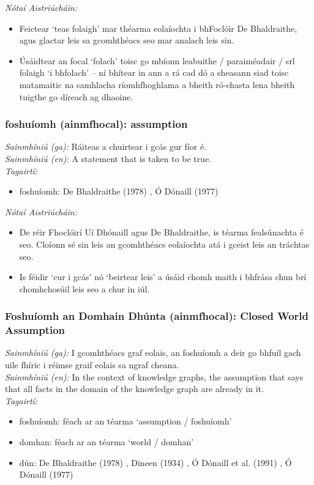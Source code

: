 \documentclass{article}
\begin{document}
 \noindent \textit{Nótaí Aistriúcháin:}
\begin{itemize}
	\item Feictear `teas folaigh' mar théarma eolaíochta i bhFoclóir De Bhaldraithe, agus glactar leis sa gcomhthéacs seo mar analach leis sin.
	\item Úsáidtear an focal `folach' toisc go mbíonn leabuithe / paraiméadair / srl folaigh `i bhfolach' -- ní bhítear in ann a rá cad dó a sheasann siad toisc matamaitic na samhlacha ríomhfhoghlama a bheith ró-chasta lena bheith tuigthe go díreach ag dhaoine.
\end{itemize}


\subsubsection*{foshuíomh (ainmfhocal): assumption}
 \noindent \textit{Sainmhíniú (ga):} Ráiteas a chuirtear i gcás gur fíor é.
\\
 \noindent \textit{Sainmhíniú (en):} A statement that is taken to be true.
\\
 \noindent \textit{Tagairtí:}
\begin{itemize}
	\item foshuíomh: De Bhaldraithe (1978) \cite{de-bhaldraithe}, Ó Dónaill (1977) \cite{odonaill}
\end{itemize}

 \noindent \textit{Nótaí Aistriúcháin:}
\begin{itemize}
	\item De réir Fhoclóirí Uí Dhónaill agus De Bhaldraithe, is téarma fealsúnachta é seo. Cloíonn sé sin leis an gcomhthéacs eolaíochta atá i gceist leis an tráchtas seo.
	\item Is féidir `cur i gcás' nó `beirtear leis' a úsáid chomh maith i bhfrása chun brí chomhchosúil leis seo a chur in iúl.
\end{itemize}


\subsubsection*{Foshuíomh an Domhain Dhúnta (ainmfhocal): Closed World Assumption}
 \noindent \textit{Sainmhíniú (ga):} I gcomhthéacs graf eolais, an foshuíomh a deir go bhfuil gach uile fhíric i réimse graif eolais sa ngraf cheana.
\\
 \noindent \textit{Sainmhíniú (en):} In the context of knowledge graphs, the assumption that says that all facts in the domain of the knowledge graph are already in it.
\\
 \noindent \textit{Tagairtí:}
\begin{itemize}
	\item foshuíomh: féach ar an téarma `assumption / foshuíomh'
	\item domhan: féach ar an téarma `world / domhan'
	\item dún: De Bhaldraithe (1978) \cite{de-bhaldraithe}, Dineen (1934) \cite{dineen}, Ó Dónaill et al. (1991) \cite{focloir-beag}, Ó Dónaill (1977) \cite{odonaill}
\end{itemize}
\end{document}
